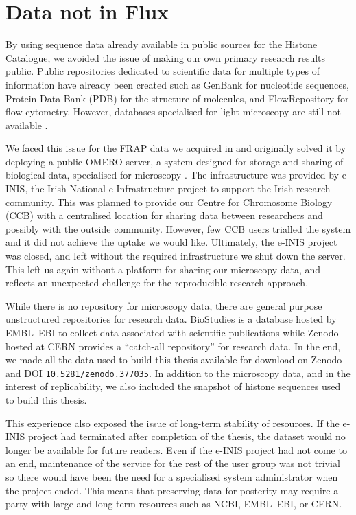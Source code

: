\section{Data not in Flux}

By using sequence data already available in public sources for the
Histone Catalogue, we avoided the issue
of making our own primary research results public.
Public repositories dedicated to scientific data
for multiple types of information have already been created such as GenBank for
nucleotide sequences, Protein Data Bank (PDB) for the structure of
molecules, and FlowRepository for flow cytometry.  However, databases
specialised for light microscopy are still not available
\citep{image-data-need-home}.

We faced this issue for the FRAP data
we acquired in  and originally solved it by deploying
a public OMERO server, a system designed for storage and sharing of
biological data, specialised for microscopy \citep{omero}.
The infrastructure was provided by
e-INIS, the Irish National e-Infrastructure project to support the
Irish research community.
This was planned to provide our Centre for Chromosome Biology (CCB)
with a centralised location for sharing data between researchers
and possibly with the outside community.
However, few CCB users
trialled the system and it did not achieve the uptake we would like.
Ultimately, the e-INIS project was closed, and left without the
required infrastructure we
shut down the server.  This left us again without a platform for
sharing our microscopy data, and reflects an unexpected challenge for
the reproducible research approach.

While there is no repository for microscopy data, there are general
purpose unstructured repositories for research data.  BioStudies is a
database hosted by EMBL--EBI to collect data associated with
scientific publications \citep{mcentyre2015biostudies} while Zenodo
hosted at CERN provides a ``catch-all repository'' for research data.
In the end, we made all the data used to build this thesis
available for download on Zenodo and
DOI \texttt{10.5281/zenodo.377035}.
In addition to the microscopy data, and in the
interest of replicability, we also included the snapshot of histone
sequences used to build this thesis.

This experience also exposed the issue of long-term stability of
resources.  If the e-INIS project had terminated after completion of
the thesis, the dataset would no longer be available for future
readers.  Even if the e-INIS project had not come to an end, maintenance
of the service for the rest of the user group was not trivial so there
would have been the need for a specialised system administrator when the
project ended.  This means that preserving data for posterity may require
a party with large and long term resources such as NCBI, EMBL--EBI, or CERN.

